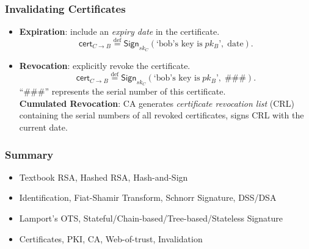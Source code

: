 \begin{frame}\frametitle{Invalidating Certificates}
\begin{itemize}
\item \textbf{Expiration}: include an \emph{expiry date} in the certificate.
\[\mathsf{cert}_{C \to B} \overset{\text{def}}{=} \mathsf{Sign}_{sk_C}(\text{`bob's key is}\; pk_B \text{'},\; \text{date}). \]
\item \textbf{Revocation}: explicitly revoke the certificate.
\[\mathsf{cert}_{C \to B} \overset{\text{def}}{=} \mathsf{Sign}_{sk_C}(\text{`bob's key is}\; pk_B \text{'},\; \text{\#\#\#}).  \]
``\#\#\#'' represents the serial number of this certificate.\\
\textbf{Cumulated Revocation}: CA generates \emph{certificate revocation list} (CRL) containing the serial numbers of all revoked certificates, signs CRL with the current date. 
\end{itemize}
\end{frame}
\begin{frame}\frametitle{Summary}
\begin{itemize}
\item Textbook RSA, Hashed RSA, Hash-and-Sign
\item Identification, Fiat-Shamir Transform, Schnorr Signature, DSS/DSA
\item Lamport's OTS, Stateful/Chain-based/Tree-based/Stateless Signature
\item Certificates, PKI, CA, Web-of-trust, Invalidation
\end{itemize}
\end{frame}
